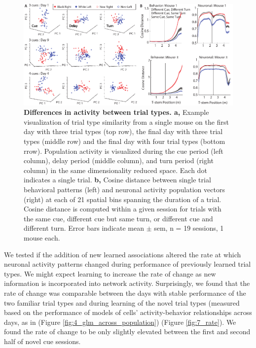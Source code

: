 \begin{figure}
\includegraphics[width=\textwidth]{figures/7_pca_all.pdf}
\caption[Differences in activity between trial types.]{\textbf{Differences in activity between trial types. a,} Example visualization of trial type similarity from a single mouse on the first day with three trial types (top row), the final day with three trial types (middle row) and the final day with four trial types (bottom rrow). Population activity is visualized during the cue period (left column), delay period (middle column), and turn period (right column) in the same dimensionality reduced space. Each dot indicates a single trial. 
%
\textbf{b,} Cosine distance between single trial behavioral patterns (left) and neuronal activity population vectors (right) at each of 21 spatial bins spanning the duration of a trial. Cosine distance is computed within a given session for trials with the same cue, different cue but same turn, or different cue and different turn. Error bars indicate mean $\pm$ sem, n = 19 sessions, 1 mouse each.
\label{fig:7_pca_all}}
\end{figure}

We tested if the addition of new learned associations altered the rate at which neuronal activity patterns changed during performance of previously learned trial types. We might expect learning to increase the rate of change as new information is incorporated into network activity. Surprisingly, we found that the rate of change was comparable between the days with stable performance of the two familiar trial types and during learning of the novel trial types (measured based on the performance of models of cells' activity-behavior relationships across days, as in (Figure  \ref{fig:4_glm_across_population}) (Figure \ref{fig:7_rate}). We found the rate of change to be only slightly elevated between the first and second half of novel cue sessions.

